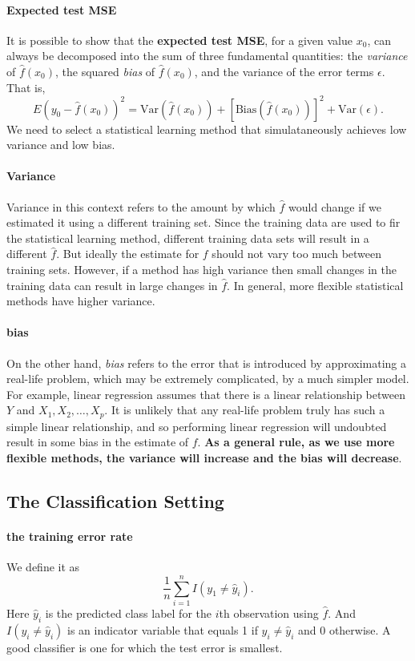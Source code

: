 \documentclass{article}
\begin{document}
\paragraph{Expected test MSE} It is possible to show that the \textbf{expected test MSE}, for a given value $x_0$, can always be decomposed into the sum of three fundamental quantities: the \textit{variance} of $\hat{f}(x_0)$, the squared \textit{bias} of $\hat{f}(x_0)$, and the variance of the error terms $\epsilon$. That is,
\[
	E\left(y_0 - \hat{f}(x_0)\right)^2 = \text{Var}(\hat{f}(x_0)) + \left[\text{Bias}(\hat{f}(x_0))\right]^2 + \text{Var}(\epsilon).
\]
We need to select a statistical learning method that simulataneously achieves low variance and low bias.

\paragraph{Variance} Variance in this context refers to the amount by which $\hat{f}$ would change if we estimated it using a different training set. Since the training data are used to fir the statistical learning method, different training data sets will result in a different $\hat{f}$. But ideally the estimate for $f$ should not vary too much between training sets. However, if a method has high variance then small changes in the training data can result in large changes in $\hat{f}$. In general, more flexible statistical methods have higher variance.

\paragraph{bias} On the other hand, \textit{bias} refers to the error that is introduced by approximating a real-life problem, which may be extremely complicated, by a much simpler model. For example, linear regression assumes that there is a linear relationship between $Y$ and $X_1, X_2, \ldots, X_p$. It is unlikely that any real-life problem truly has such a simple linear relationship, and so performing linear regression will undoubted result in some bias in the estimate of $f$. \textbf{As a general rule, as we use more flexible methods, the variance will increase and the bias will decrease}.

\subsection{The Classification Setting}
\paragraph{the training error rate} We define it as
\[
	\frac{1}{n}\sum_{i=1}^{n}I(y_1 \ne \hat{y}_i).
\]
Here $\hat{y}_i$ is the predicted class label for the $i$th observation using $\hat{f}$. And $I(y_i \ne \hat{y}_i)$ is an indicator variable that equals 1 if $y_i \ne \hat{y}_i$ and 0 otherwise. A good classifier is one for which the test error is smallest.
\end{document}
